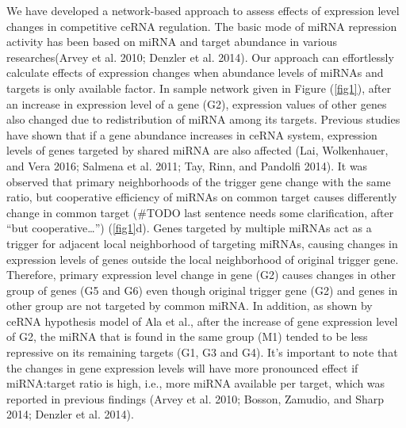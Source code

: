 \documentclass[]{article}
\begin{document}
We have developed a network-based approach to assess effects of
expression level changes in competitive ceRNA regulation. The basic mode
of miRNA repression activity has been based on miRNA and target
abundance in various researches(Arvey et al. 2010; Denzler et al. 2014).
Our approach can effortlessly calculate effects of expression changes
when abundance levels of miRNAs and targets is only available factor. In
sample network given in Figure (\autoref{fig1}), after an increase in
expression level of a gene (G2), expression values of other genes also
changed due to redistribution of miRNA among its targets. Previous
studies have shown that if a gene abundance increases in ceRNA system,
expression levels of genes targeted by shared miRNA are also affected
(Lai, Wolkenhauer, and Vera 2016; Salmena et al. 2011; Tay, Rinn, and
Pandolfi 2014). It was observed that primary neighborhoods of the
trigger gene change with the same ratio, but cooperative efficiency of
miRNAs on common target causes differently change in common target
(\#TODO last sentence needs some clarification, after ``but
cooperative\ldots{}'') (\autoref{fig1}d). Genes targeted by multiple
miRNAs act as a trigger for adjacent local neighborhood of targeting
miRNAs, causing changes in expression levels of genes outside the local
neighborhood of original trigger gene. Therefore, primary expression
level change in gene (G2) causes changes in other group of genes (G5 and
G6) even though original trigger gene (G2) and genes in other group are
not targeted by common miRNA. In addition, as shown by ceRNA hypothesis
model of Ala et al., after the increase of gene expression level of G2,
the miRNA that is found in the same group (M1) tended to be less
repressive on its remaining targets (G1, G3 and G4). It's important to
note that the changes in gene expression levels will have more
pronounced effect if miRNA:target ratio is high, i.e., more miRNA
available per target, which was reported in previous findings (Arvey et
al. 2010; Bosson, Zamudio, and Sharp 2014; Denzler et al. 2014).
\href{}{}
\end{document}
